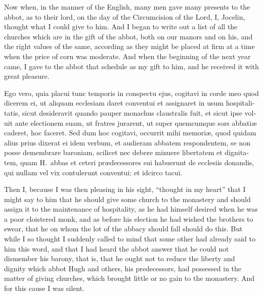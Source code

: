 \documentclass{book}
\begin{document}
\begin{paracol}{2}
\begin{otherlanguage}{latin}
\end{otherlanguage}

\switchcolumn

Now when, in the manner of the English, many men gave many presents to the abbot, as to their lord, on the day of the Circumcision of the Lord, I, Jocelin, thought what I could give to him. And I began to write out a list of all the churches which are in the gift of the abbot, both on our manors and on his, and the right values of the same, according as they might be placed at firm at a time when the price of corn was moderate. And when the beginning of the next year came, I gave to the abbot that schedule as my gift to him, and he received it with great pleasure.

\switchcolumn*

\begin{otherlanguage}{latin}
Ego vero, quia placui tunc temporis in conspectu ejus, cogitavi in corde meo quod dicerem ei, ut aliquam ecclesiam daret conventui et assignaret in usum hospitalitatis, sicut desideravit quando pauper monachus claustralis fuit, et sicut ipse voluit ante electionem suam, ut fratres jurarent, ut super quemcumque sors abbati\ae{} caderet, hoc faceret. Sed dum hoc cogitavi, occurrit mihi memori\ae{}, quod quidam alius prius dixerat ei idem verbum, et audieram abbatem respondentem, se non posse demembrare baroniam, scilicet nec debere minuere libertatem et dignitatem, quam H.\ abbas et ceteri pr\ae{}decessores sui habuerunt de ecclesiis donandis, qui nullam vel vix contulerunt conventui; et idcirco tacui.
\end{otherlanguage}

\switchcolumn

Then I, because I was then pleasing in his sight, ``thought in my heart'' that I might say to him that he should give some church to the monastery and should assign it to the maintenance of hospitality, as he had himself desired when he was a poor cloistered monk, and as before his election he had wished the brothers to swear, that he on whom the lot of the abbacy should fall should do this. But while I so thought I suddenly called to mind that some other had already said to him this word, and that I had heard the abbot answer that he could not dismember his barony, that is, that he ought not to reduce the liberty and dignity which abbot Hugh and others, his predecessors, had possessed in the matter of giving churches, which brought little or no gain to the monastery. And for this cause I was silent.


\end{paracol}
\end{document}

